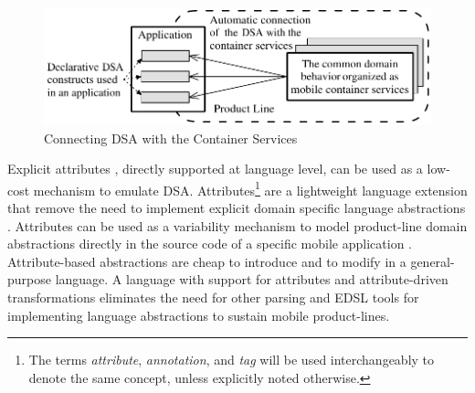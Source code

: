 \begin{figure}[ht]
	\begin{center}
		\includegraphics[width=12cm,height=!]{ch01/dsaserv}
	\end{center}
	\caption{Connecting DSA with the Container Services}
	\label{fig:ch01dsaserv}
\end{figure}


Explicit attributes \cite{java.explicit.programming}, directly supported at language level, can be used as a low-cost mechanism to emulate DSA. Attributes\footnote{The terms \textit{attribute}, \textit{annotation}, and \textit{tag} will be used interchangeably to denote the same concept, unless explicitly noted otherwise.} are a lightweight language extension that remove the need to implement explicit domain specific language abstractions \cite{Taha.1997}. Attributes can be used as a variability mechanism to model product-line domain abstractions directly in the source code of a specific mobile application . Attribute-based abstractions are cheap to introduce and to modify in a general-purpose language.
 A language with support for attributes and attribute-driven transformations eliminates the need for other parsing and EDSL tools for implementing language abstractions to sustain mobile product-lines.


